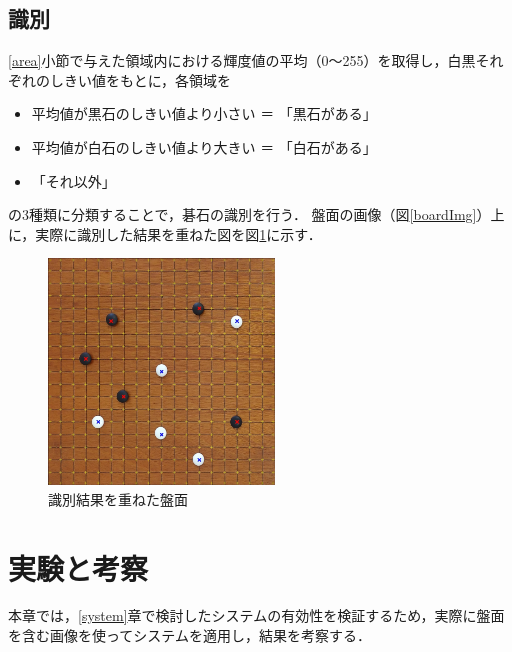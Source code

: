 \documentclass[openright]{nitocs}
\numberwithin{equation}{section}
\begin{document}
        \subsection{識別} \label{identify}  
            \ref{area}小節で与えた領域内における輝度値の平均（0～255）を取得し，白黒それぞれのしきい値をもとに，各領域を
            \begin{itemize} %
                \item 平均値が黒石のしきい値より小さい ＝ 「黒石がある」
                \item 平均値が白石のしきい値より大きい ＝ 「白石がある」
                \item 「それ以外」
            \end{itemize}
            の3種類に分類することで，碁石の識別を行う．
            盤面の画像（図\ref{boardImg}）上に，実際に識別した結果を重ねた図を図\ref{result}に示す．

            \begin{figure}[tb] %
                \begin{center}
                \includegraphics[clip,width=60mm]{result.jpg} 
                \caption{識別結果を重ねた盤面}
                \label{result}
                \end{center}
            \end{figure}

    \section{実験と考察} %
        本章では，\ref{system}章で検討したシステムの有効性を検証するため，実際に盤面を含む画像を使ってシステムを適用し，結果を考察する．
\end{document}
